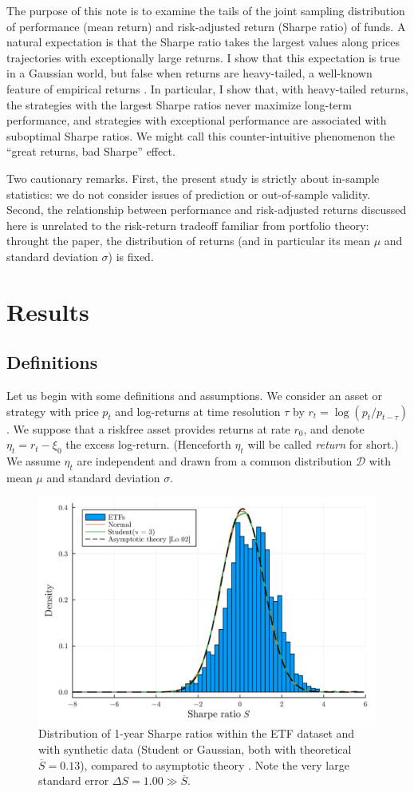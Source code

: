 \documentclass[
reprint,
amsmath,amssymb,
aps,
]{revtex4-2}
\begin{document}
The purpose of this note is to examine the tails of the joint sampling distribution of performance (mean return) and risk-adjusted return (Sharpe ratio) of funds.
A natural expectation is that the Sharpe ratio takes the largest values along prices trajectories with exceptionally large returns.
I show that this expectation is true in a Gaussian world, but false when returns are heavy-tailed, a well-known feature of empirical returns \cite{bouchaudTheory2003}. 
In particular, I show that, with heavy-tailed returns, the strategies with the largest Sharpe ratios never maximize long-term performance, and strategies with exceptional performance are associated with suboptimal Sharpe ratios. 
We might call this counter-intuitive phenomenon the ``great returns, bad Sharpe'' effect. 

Two cautionary remarks. 
First, the present study is strictly about in-sample statistics: we do not consider issues of prediction or out-of-sample validity.  
Second, the relationship between performance and risk-adjusted returns discussed here is unrelated to the risk-return tradeoff familiar from portfolio theory: throught the paper, the distribution of returns (and in particular its mean $\mu$ and standard deviation $\sigma$) is fixed. 

\section{Results}

\subsection{Definitions}

Let us begin with some definitions and assumptions.
We consider an asset or strategy with price $p_t$ and log-returns at time resolution $\tau$ by $r_t = \log(p_t/p_{t-\tau})$.
We suppose that a riskfree asset provides returns at rate $r_0$, and denote $\eta_t = r_t - \xi_0$ the excess log-return. 
(Henceforth $\eta_t$ will be called \emph{return} for short.)
We assume $\eta_t$ are independent and drawn from a common distribution $\mathcal{D}$ with mean $\mu$ and standard deviation $\sigma$. 

\begin{figure}[t!]
    \includegraphics[width = .45\textwidth]{sharpe-dist.png}
    \caption{
        Distribution of 1-year Sharpe ratios within the ETF dataset and with synthetic data (Student or Gaussian, both with theoretical $\overline{S} = 0.13$), compared to asymptotic theory \cite{loStatistics2002}. 
        Note the very large standard error $\Delta S = 1.00 \gg \overline{S}$.
        }
    \label{sharpe-dist}
\end{figure}
\end{document}
